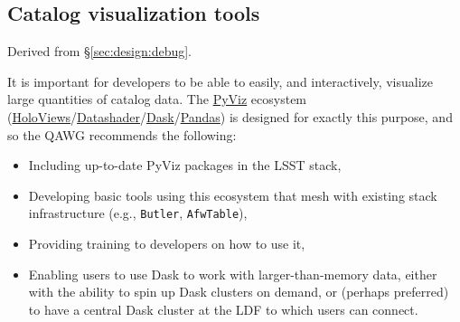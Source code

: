 \subsection{Catalog visualization tools}


Derived from \S\ref{sec:design:debug}.

It is important for developers to be able to easily, and interactively, visualize large quantities of catalog data.
The \href{http://pyviz.org}{PyViz} ecosystem (\href{http://holoviews.org}{HoloViews}/\href{http://datashader.org}{Datashader}/\href{http://dask.pydata.org}{Dask}/\href{http://pandas.pydata.org}{Pandas}) is designed for exactly this purpose, and so the QAWG recommends the following:
\begin{itemize}
    \item{Including up-to-date PyViz packages in the LSST stack,}
    \item{Developing basic tools using this ecosystem that mesh with existing stack infrastructure (e.g., \texttt{Butler}, \texttt{AfwTable}),}
    \item{Providing training to developers on how to use it,}
    \item{Enabling users to use Dask to work with larger-than-memory data, either with the ability to spin up Dask clusters on demand, or (perhaps preferred) to have a central Dask cluster at the LDF to which users can connect.}
\end{itemize}

